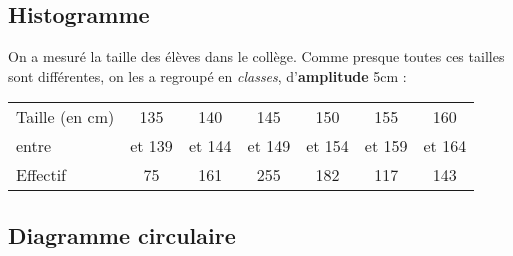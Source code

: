 \documentclass[../€Cours-complet/Cours-complet]{subfiles}
\begin{document}
\subsection{Histogramme}

\begin{exemple}
	On a mesuré la taille des élèves dans le collège. Comme presque toutes ces tailles sont différentes, on les a regroupé en \textit{classes}, d'\textbf{amplitude} 5cm :


	\begin{center}
		\begin{tabular}{|l|c|c|c|c|c|c|}
			\hline
			Taille (en cm) & 135    & 140    & 145    & 150    & 155    & 160
			\\
			entre          & et 139 & et 144 & et 149 & et 154 & et 159 & et 164
			\\ \hline
			Effectif       & 75     & 161    & 255    & 182    & 117    & 143    %
			\\ \hline
		\end{tabular}
	\end{center}

	\begin{center}
	\end{center}
\end{exemple}

\subsection{Diagramme circulaire}
\end{document}
